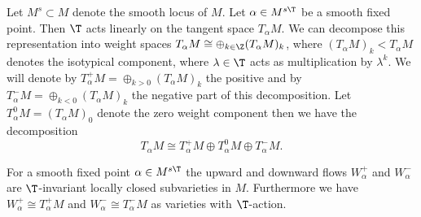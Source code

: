 Let $M^s\subset M$ denote the smooth locus of $M$. Let $\alpha\in M^{s\T}$ be a smooth fixed point.  Then $\T$ acts linearly on the tangent space $T_\alpha M$. We can decompose this representation into weight spaces
$T_\alpha M\cong \oplus_{k\in \Z} (T_\alpha M)_k$, where $(T_\alpha M)_k<T_\alpha M$ denotes the isotypical component, where $\lambda\in \T$ acts as multiplication by $\lambda^k$. We will denote by $T^+_\alpha M = \oplus_{k>0}(T_\alpha M)_k$ the positive and by $T^-_\alpha M = \oplus_{k<0}(T_\alpha M)_k$ the negative part of this decomposition. Let  $T^0_\alpha M=(T_\alpha M)_0$ denote the zero weight component then we have the decomposition $$T_\alpha M \cong  T^+_\alpha M \oplus T^0_\alpha M \oplus T^-_\alpha M. $$

\begin{proposition}
\notready\label{bbprop} For a smooth fixed point $\alpha\in M^{s\T}$ the upward and downward flows  $W^+_\alpha$ and $W^-_\alpha$ are $\T$-invariant locally closed subvarieties in $M$. Furthermore we have $W^+_\alpha \cong T^+_\alpha M$ and $W^-_\alpha\cong T^-_\alpha M$ as varieties with $\T$-action.  \end{proposition}
